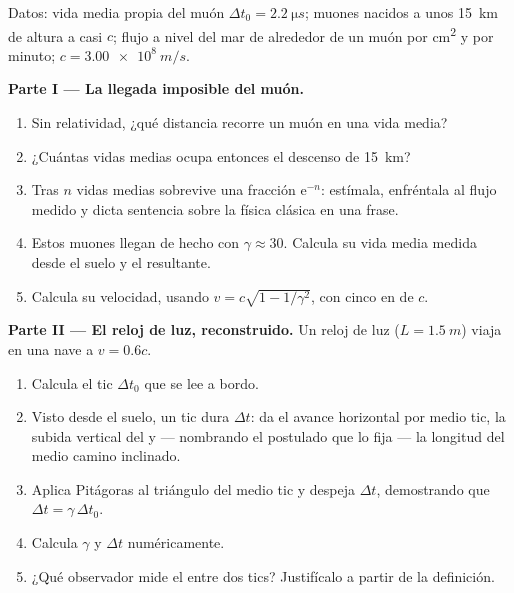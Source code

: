 \begin{problem}
\label{pb:g12:special-relativity:1}
Datos: vida media propia del muón $\Delta t_0 = \qty{2.2}{\micro s}$; muones nacidos a
unos \qty{15}{km} de altura a casi $c$; flujo a nivel del mar de alrededor de un muón
por \unit{cm^2} y por minuto; $c = \qty{3.00e8}{m/s}$.

\medskip
\noindent\textbf{Parte I --- La llegada imposible del muón.}
\begin{enumerate}
  \item Sin relatividad, ¿qué distancia recorre un muón en una vida media?
  \item ¿Cuántas vidas medias ocupa entonces el descenso de \qty{15}{km}?
  \item Tras $n$ vidas medias sobrevive una fracción $\mathrm{e}^{-n}$: estímala,
        enfréntala al flujo medido y dicta sentencia sobre la física clásica en una
        frase.
  \item Estos muones llegan de hecho con $\gamma \approx 30$. Calcula su vida media
        medida desde el suelo y el  resultante.
  \item Calcula su velocidad, usando $v = c\sqrt{1 - 1/\gamma^2}$, con cinco  en  de $c$.
\end{enumerate}

\medskip
\noindent\textbf{Parte II --- El reloj de luz, reconstruido.}
Un reloj de luz ($L = \qty{1.5}{m}$) viaja en una nave a $v = 0.6c$.
\begin{enumerate}[resume]
  \item Calcula el tic $\Delta t_0$ que se lee a bordo.
  \item Visto desde el suelo, un tic dura $\Delta t$: da el avance horizontal por
        medio tic, la subida vertical del  y --- nombrando el postulado que lo
        fija --- la longitud del medio camino inclinado.
  \item Aplica Pitágoras al triángulo del medio tic y despeja $\Delta t$, demostrando
        que $\Delta t = \gamma\,\Delta t_0$.
  \item Calcula $\gamma$ y $\Delta t$ numéricamente.
  \item ¿Qué observador mide el  entre dos tics? Justifícalo a partir de
        la definición.
\end{enumerate}


\end{problem}
